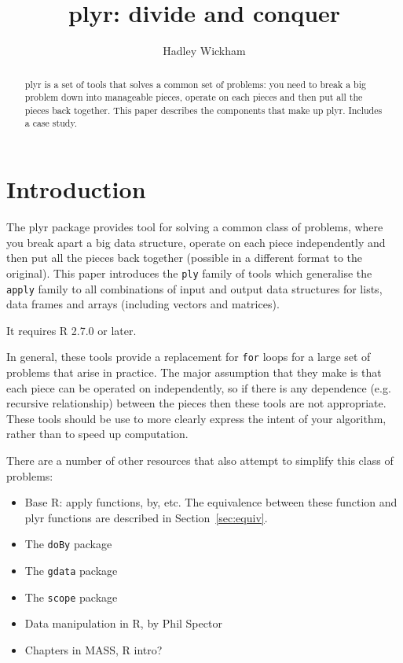 \documentclass[letterpaper,oneside]{scrartcl}
\title{plyr: divide and conquer}
\author{Hadley Wickham}
\begin{document}
\maketitle

\begin{abstract}
plyr is a set of tools that solves a common set of problems: you need to break a big problem down into manageable pieces, operate on each pieces and then put all the pieces back together.  This paper describes the components that make up plyr.  Includes a case study.
\end{abstract}

\section{Introduction}

The {\tt} plyr package provides tool for solving a common class of problems, where you break apart a big data structure, operate on each piece independently and then put all the pieces back together (possible in a different format to the original).  This paper introduces the {\tt ply} family of tools which generalise the {\tt apply} family to all combinations of input and output data structures for lists, data frames and arrays (including vectors and matrices).

It requires R 2.7.0 or later.

In general, these tools provide a replacement for {\tt for} loops for a large set of problems that arise in practice.  The major assumption that they make is that each piece can be operated on independently, so if there is any dependence (e.g. recursive relationship) between the pieces then these tools are not appropriate.  These tools should be use to more clearly express the intent of your algorithm, rather than to speed up computation.  

There are a number of other resources that also attempt to simplify this class of problems:

\begin{itemize}
  \item Base R:  apply functions, by, etc.  The equivalence between these function and plyr functions are described in Section~\ref{sec:equiv}.
  
  \item The {\tt doBy} package
  \item The {\tt gdata} package
  \item The {\tt scope} package
  \item Data manipulation in R, by Phil Spector
  \item Chapters in MASS, R intro?
  
\end{itemize}
\end{document}
